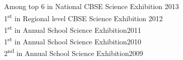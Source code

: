 \documentclass[10pt]{article}
\renewcommand{\section}[1]{\pagebreak[3]%
    \hyphenpenalty=10000%
    \vspace{1.3\baselineskip}%
    \phantomsection\addcontentsline{toc}{section}{#1}%
    \noindent\llap{\scshape\smash{\parbox[t]{\marginparwidth}{\raggedright #1}}}%
    \vspace{-\baselineskip}\par}
\newenvironment{innerlist}[1][\enskip\textbullet]%
        {\begin{itemize}[#1,leftmargin=*,parsep=0pt,itemsep=0pt,topsep=0pt,partopsep=0pt]}
        {\end{itemize}}
\begin{document}


Among top 6 in National CBSE Science Exhibition \hfill  2013\\


1\textsuperscript{st} in Regional level CBSE Science Exhibition \hfill  2012\\

1\textsuperscript{st} in Annual School Science Exhibition\hfill 2011\\

1\textsuperscript{st} in Annual School Science Exhibition\hfill  2010\\

2\textsuperscript{nd} in Annual School Science Exhibition\hfill  2009\\

\end{document}

